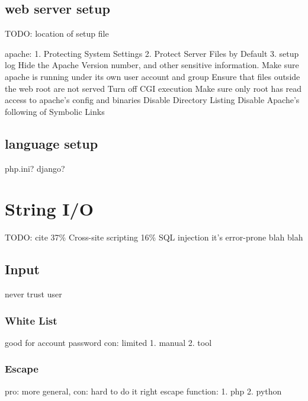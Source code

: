 \documentclass[12pt, a4paper]{article}
\begin{document}
\subsection{web server setup}
TODO: location of setup file

apache:
1. Protecting System Settings
2. Protect Server Files by Default
3. setup log
Hide the Apache Version number, and other sensitive information. %
Make sure apache is running under its own user account and group %
Ensure that files outside the web root are not served
Turn off CGI execution
Make sure only root has read access to apache's config and binaries
Disable Directory Listing
Disable Apache’s following of Symbolic Links

\subsection{language setup}
php.ini?
django?

%   
\section{String I/O}
TODO: cite
37\% Cross-site scripting
16\% SQL injection
it's error-prone
blah blah

\subsection{Input}
never trust user

\subsubsection{White List}
good for account password
con: limited
1. manual
2. tool

\subsubsection{Escape}
pro: more general,
con: hard to do it right
escape function:
1. php
2. python
\end{document}
